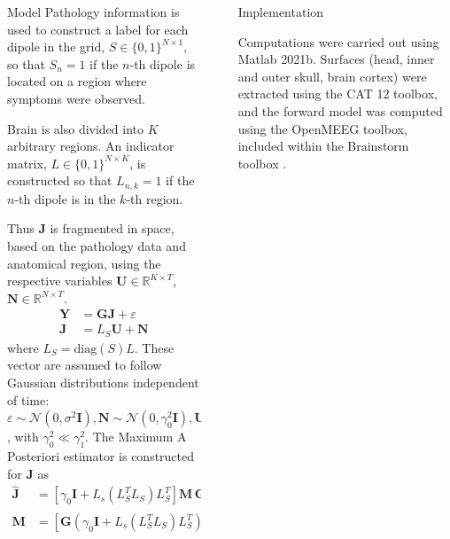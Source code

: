 \documentclass[final]{beamer}
\newlength{\sepwidth}
\newlength{\colwidth}
\newcommand{\separatorcolumn}{\begin{column}{\sepwidth}\end{column}}
\newcommand{\ppar}[1]{ \left( #1 \right) }
\newcommand{\spar}[1]{ \left[ #1 \right] }
\newcommand{\J}{\mathbf{J}}
\newcommand{\Y}{\mathbf{Y}}
\newcommand{\G}{\mathbf{G}}
\newcommand{\U}{\mathbf{U}}
\newcommand{\N}{\mathbf{N}}
\newcommand{\M}{\mathbf{M}}
\newcommand{\id}{\mathbf{I}}
\newcommand{\norm}{\mathcal{N}}
\newcommand{\R}{\mathbb{R}}
\begin{document}
\begin{frame}[t]
\begin{columns}[t]
\begin{column}{\colwidth}
\begin{exampleblock}{Model}
Pathology information is used to construct a label for each dipole in the grid,
$S \in \{ 0, 1 \}^{N\times 1}$, 
so that $S_n = 1$ if the $n$-th dipole is located on a
region where symptoms were observed.

Brain is also divided into $K$ arbitrary regions. An indicator matrix,
$L \in \{ 0, 1 \}^{N\times K}$, 
is constructed so that $L_{n,k} =1$ if the $n$-th dipole is in the $k$-th region.

Thus $\J$ is fragmented in space, based on the pathology data and anatomical region, using the respective variables 
$\U \in \R^{K\times T}$, $\N \in \R^{N\times T}$.
\begin{align}
    \Y &= \G \J + \varepsilon \\
    \J &=  L_S \U + \N
\end{align}
where $L_S = \text{diag}\ppar{S} L$. These vector are assumed to follow Gaussian distributions independent of time:
$\varepsilon \sim  \norm\ppar{0, \sigma^2 \id },
    \N \sim  
    \norm\ppar{0, \gamma_0^2 \id },
    \U \sim  
    \norm\ppar{0, \gamma_1^2 \id } 
$,
with $\gamma_0^2 \ll \gamma_1^2$.
%
The Maximum A Posteriori estimator is constructed for $\J$ as
\begin{align}
\hat{\J} &= \spar{ \gamma_0 \id + L_s\ppar{L_S^T L_S}L_S^T }\M\, \G^T\, \Y,
\\
\M &=\spar{ \G \ppar{ 
\gamma_0 \id + L_s\ppar{L_S^T L_S}L_S^T
} \G^T
 + \sigma^2 \id }^{-1}.
\end{align}

  \end{exampleblock}

\end{column}

\separatorcolumn

\begin{column}{\colwidth}

\begin{block}{Implementation}

Computations were carried out using Matlab 2021b. Surfaces (head, inner and outer skull, brain cortex) were extracted using the CAT 12 toolbox, and the forward model was computed using the OpenMEEG toolbox, included within the Brainstorm toolbox \cite{brainstorm}.




\end{block}
\end{column}
\end{columns}
\end{frame}
\end{document}
